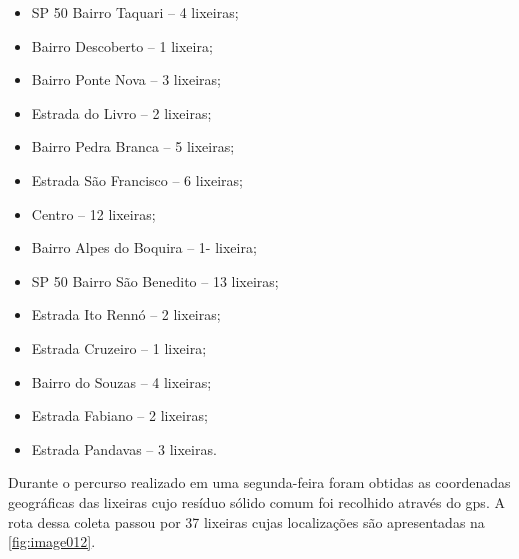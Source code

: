 \begin{itemize}
	\item SP 50 Bairro Taquari – 4 lixeiras; 
	\item Bairro Descoberto – 1 lixeira; 
	\item Bairro Ponte Nova – 3 lixeiras; 
	\item Estrada do Livro – 2 lixeiras; 
	\item Bairro Pedra Branca – 5 lixeiras; 
	\item Estrada São Francisco – 6 lixeiras; 
	\item Centro – 12 lixeiras; 
	\item Bairro Alpes do Boquira – 1- lixeira; 
	\item SP 50 Bairro São Benedito – 13 lixeiras; 
	\item Estrada Ito Rennó – 2 lixeiras; 
	\item Estrada Cruzeiro – 1 lixeira; 
	\item Bairro do Souzas – 4 lixeiras; 
	\item Estrada Fabiano – 2 lixeiras; 
	\item Estrada Pandavas – 3 lixeiras.
\end{itemize}

Durante o percurso realizado em uma segunda-feira foram obtidas as coordenadas geográficas das lixeiras cujo resíduo sólido comum foi recolhido através do \gls{gps}. A rota dessa coleta passou por 37 lixeiras cujas localizações são apresentadas na \autoref{fig:image012}. 

